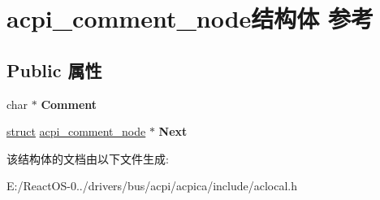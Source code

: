 \hypertarget{structacpi__comment__node}{}\section{acpi\+\_\+comment\+\_\+node结构体 参考}
\label{structacpi__comment__node}
\subsection*{Public 属性}
\begin{DoxyCompactItemize}
\item 
\mbox{\label{structacpi__comment__node_aced62071a2c5067ab364ec93539c8df3}} 
char $\ast$ {\bfseries Comment}
\item 
\mbox{\label{structacpi__comment__node_a2d3c1243ecdfd03ee559c26a49e259c5}} 
\hyperlink{interfacestruct}{struct} \hyperlink{structacpi__comment__node}{acpi\+\_\+comment\+\_\+node} $\ast$ {\bfseries Next}
\end{DoxyCompactItemize}


该结构体的文档由以下文件生成\+:\begin{DoxyCompactItemize}
\item 
E\+:/\+React\+O\+S-\/0../drivers/bus/acpi/acpica/include/aclocal.\+h\end{DoxyCompactItemize}
